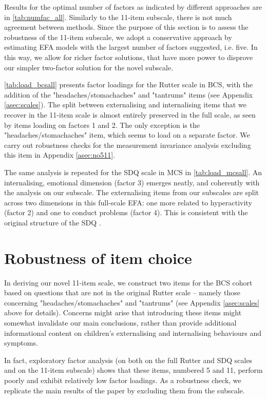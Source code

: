 Results for the optimal number of factors as indicated by different approaches are in \autoref{tab:numfac_all}. Similarly to the 11-item subscale, there is not much agreement between methods. Since the purpose of this section is to assess the robustness of the 11-item subscale, we adopt a conservative approach by estimating EFA models with the largest number of factors suggested, i.e. five. In this way, we allow for richer factor solutions, that have more power to disprove our simpler two-factor solution for the novel subscale.

\autoref{tab:load_bcsall} presents factor loadings for the Rutter scale in BCS, with the addition of the "headaches/stomachaches" and "tantrums" items (see Appendix \autoref{asec:scales}). The split between externalising and internalising items that we recover in the 11-item scale is almost entirely preserved in the full scale, as seen by items loading on factors 1 and 2. The only exception is the "headaches/stomachaches" item, which seems to load on a separate factor. We carry out robustness checks for the measurement invariance analysis excluding this item in Appendix \autoref{asec:no511}.

The same analysis is repeated for the SDQ scale in MCS in \autoref{tab:load_mcsall}. An internalising, emotional dimension (factor 3) emerges neatly, and coherently with the analysis on our subscale. The externalising items from our subscales are split across two dimensions in this full-scale EFA: one more related to hyperactivity (factor 2) and one to conduct problems (factor 4). This is consistent with the original structure of the SDQ \citep{Goodman1997}.


\section{Robustness of item choice}\label{asec:no511}

In deriving our novel 11-item scale, we construct two items for the BCS cohort based on questions that are not in the original Rutter scale -- namely those concerning "headaches/stomachaches" and "tantrums" (see Appendix \autoref{asec:scales} above for details). Concerns might arise that introducing these items might somewhat invalidate our main conclusions, rather than provide additional informational content on children's externalising and internalising behaviours and symptoms.

In fact, exploratory factor analysis (on both on the full Rutter and SDQ scales and on the 11-item subscale) shows that these items, numbered 5 and 11, perform poorly and exhibit relatively low factor loadings. As a robustness check, we replicate the main results of the paper by excluding them from the subscale.

